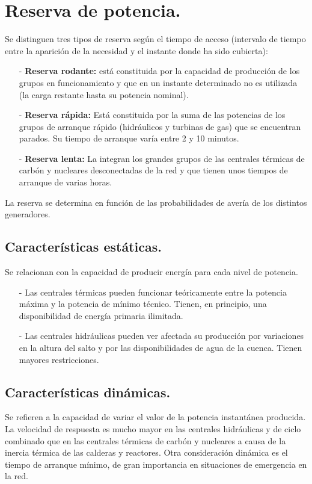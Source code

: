 \section{Reserva de potencia.} 
Se distinguen tres tipos de reserva según el tiempo de acceso (intervalo de tiempo entre la aparición de la necesidad y el instante donde ha sido cubierta):
\begin{itemize}
	\item [-]\textbf{Reserva rodante:} está constituida por la capacidad de producción de los grupos en
	funcionamiento y que en un instante determinado no es utilizada (la carga restante hasta su potencia nominal). 
	\item [-]\textbf{Reserva rápida:} Está constituida por la suma de las potencias de los grupos de arranque
	rápido (hidráulicos y turbinas de gas) que se encuentran parados. Su tiempo de arranque varía
	entre 2 y 10 minutos.
	\item [-]\textbf{Reserva lenta:} La integran los grandes grupos de las centrales térmicas de carbón y nucleares
	desconectadas de la red y que tienen unos tiempos de arranque de varias horas.
\end{itemize}
La reserva se determina en función de las probabilidades de avería de los distintos generadores.
\subsection{Características estáticas.}
Se relacionan con la capacidad de producir energía para cada nivel de potencia. 
\begin{itemize}
	\item [-]Las centrales térmicas pueden funcionar teóricamente entre la potencia máxima y la potencia de
	mínimo técnico. Tienen, en principio, una disponibilidad de energía primaria ilimitada.
	\item [-] Las centrales hidráulicas pueden ver afectada su producción por variaciones en la altura del salto y
	por las disponibilidades de agua de la cuenca. Tienen mayores restricciones.
\end{itemize}
\subsection{Características dinámicas.}
Se refieren a la capacidad de variar el valor de la potencia instantánea producida. La velocidad de respuesta es mucho mayor en las centrales hidráulicas y de ciclo combinado que
en las centrales térmicas de carbón y nucleares a causa de la inercia térmica de las calderas y reactores. Otra consideración dinámica es el tiempo de arranque mínimo, de gran importancia en
situaciones de emergencia en la red.

